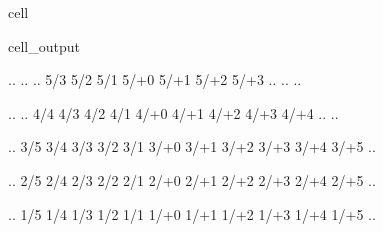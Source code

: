 \documentclass[letterpaper,10pt,english]{jupyterBook}
\begin{document}
\begin{sphinxuseclass}{cell}
\begin{sphinxVerbatimOutput}
\begin{sphinxuseclass}{cell_output}
\begin{sphinxVerbatim}[commandchars=\\\{\}]
 .\PYGZus{}\PYGZus{}\PYGZus{}\PYGZus{}\PYGZus{}. .\PYGZus{}\PYGZus{}\PYGZus{}\PYGZus{}\PYGZus{}. .\PYGZus{}\PYGZus{}\PYGZus{}\PYGZus{}\PYGZus{}. \PYGZob{}\PYGZhy{}5/\PYGZhy{}3\PYGZcb{} \PYGZob{}\PYGZhy{}5/\PYGZhy{}2\PYGZcb{} \PYGZob{}\PYGZhy{}5/\PYGZhy{}1\PYGZcb{} \PYGZob{}\PYGZhy{}5/+0\PYGZcb{} \PYGZob{}\PYGZhy{}5/+1\PYGZcb{} \PYGZob{}\PYGZhy{}5/+2\PYGZcb{} \PYGZob{}\PYGZhy{}5/+3\PYGZcb{} .\PYGZus{}\PYGZus{}\PYGZus{}\PYGZus{}\PYGZus{}. .\PYGZus{}\PYGZus{}\PYGZus{}\PYGZus{}\PYGZus{}. .\PYGZus{}\PYGZus{}\PYGZus{}\PYGZus{}\PYGZus{}. 



 .\PYGZus{}\PYGZus{}\PYGZus{}\PYGZus{}\PYGZus{}. .\PYGZus{}\PYGZus{}\PYGZus{}\PYGZus{}\PYGZus{}. \PYGZob{}\PYGZhy{}4/\PYGZhy{}4\PYGZcb{} \PYGZob{}\PYGZhy{}4/\PYGZhy{}3\PYGZcb{} \PYGZob{}\PYGZhy{}4/\PYGZhy{}2\PYGZcb{} \PYGZob{}\PYGZhy{}4/\PYGZhy{}1\PYGZcb{} \PYGZob{}\PYGZhy{}4/+0\PYGZcb{} \PYGZob{}\PYGZhy{}4/+1\PYGZcb{} \PYGZob{}\PYGZhy{}4/+2\PYGZcb{} \PYGZob{}\PYGZhy{}4/+3\PYGZcb{} \PYGZob{}\PYGZhy{}4/+4\PYGZcb{} .\PYGZus{}\PYGZus{}\PYGZus{}\PYGZus{}\PYGZus{}. .\PYGZus{}\PYGZus{}\PYGZus{}\PYGZus{}\PYGZus{}. 



 .\PYGZus{}\PYGZus{}\PYGZus{}\PYGZus{}\PYGZus{}. \PYGZob{}\PYGZhy{}3/\PYGZhy{}5\PYGZcb{} \PYGZob{}\PYGZhy{}3/\PYGZhy{}4\PYGZcb{} \PYGZob{}\PYGZhy{}3/\PYGZhy{}3\PYGZcb{} \PYGZob{}\PYGZhy{}3/\PYGZhy{}2\PYGZcb{} \PYGZob{}\PYGZhy{}3/\PYGZhy{}1\PYGZcb{} \PYGZob{}\PYGZhy{}3/+0\PYGZcb{} \PYGZob{}\PYGZhy{}3/+1\PYGZcb{} \PYGZob{}\PYGZhy{}3/+2\PYGZcb{} \PYGZob{}\PYGZhy{}3/+3\PYGZcb{} \PYGZob{}\PYGZhy{}3/+4\PYGZcb{} \PYGZob{}\PYGZhy{}3/+5\PYGZcb{} .\PYGZus{}\PYGZus{}\PYGZus{}\PYGZus{}\PYGZus{}. 



 .\PYGZus{}\PYGZus{}\PYGZus{}\PYGZus{}\PYGZus{}. \PYGZob{}\PYGZhy{}2/\PYGZhy{}5\PYGZcb{} \PYGZob{}\PYGZhy{}2/\PYGZhy{}4\PYGZcb{} \PYGZob{}\PYGZhy{}2/\PYGZhy{}3\PYGZcb{} \PYGZob{}\PYGZhy{}2/\PYGZhy{}2\PYGZcb{} \PYGZob{}\PYGZhy{}2/\PYGZhy{}1\PYGZcb{} \PYGZob{}\PYGZhy{}2/+0\PYGZcb{} \PYGZob{}\PYGZhy{}2/+1\PYGZcb{} \PYGZob{}\PYGZhy{}2/+2\PYGZcb{} \PYGZob{}\PYGZhy{}2/+3\PYGZcb{} \PYGZob{}\PYGZhy{}2/+4\PYGZcb{} \PYGZob{}\PYGZhy{}2/+5\PYGZcb{} .\PYGZus{}\PYGZus{}\PYGZus{}\PYGZus{}\PYGZus{}. 



 .\PYGZus{}\PYGZus{}\PYGZus{}\PYGZus{}\PYGZus{}. \PYGZob{}\PYGZhy{}1/\PYGZhy{}5\PYGZcb{} \PYGZob{}\PYGZhy{}1/\PYGZhy{}4\PYGZcb{} \PYGZob{}\PYGZhy{}1/\PYGZhy{}3\PYGZcb{} \PYGZob{}\PYGZhy{}1/\PYGZhy{}2\PYGZcb{} \PYGZob{}\PYGZhy{}1/\PYGZhy{}1\PYGZcb{} \PYGZob{}\PYGZhy{}1/+0\PYGZcb{} \PYGZob{}\PYGZhy{}1/+1\PYGZcb{} \PYGZob{}\PYGZhy{}1/+2\PYGZcb{} \PYGZob{}\PYGZhy{}1/+3\PYGZcb{} \PYGZob{}\PYGZhy{}1/+4\PYGZcb{} \PYGZob{}\PYGZhy{}1/+5\PYGZcb{} .\PYGZus{}\PYGZus{}\PYGZus{}\PYGZus{}\PYGZus{}. 




\end{sphinxVerbatim}
\end{sphinxuseclass}
\end{sphinxVerbatimOutput}
\end{sphinxuseclass}
\end{document}
